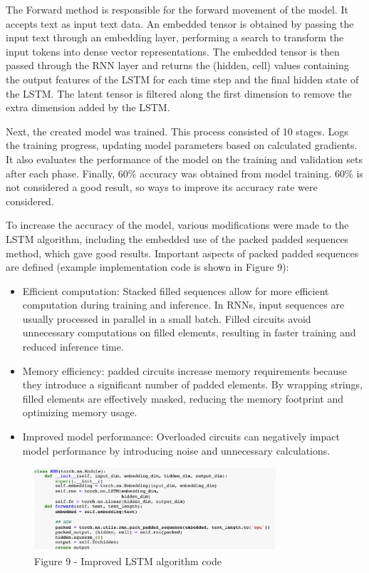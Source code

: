 The Forward method is responsible for the forward movement of the model.
It accepts text as input text data. An embedded tensor is obtained by
passing the input text through an embedding layer, performing a search
to transform the input tokens into dense vector representations. The
embedded tensor is then passed through the RNN layer and returns the
(hidden, cell) values containing the output features of the LSTM for
each time step and the final hidden state of the LSTM. The latent tensor
is filtered along the first dimension to remove the extra dimension
added by the LSTM.

Next, the created model was trained. This process consisted of 10
stages. Logs the training progress, updating model parameters based on
calculated gradients. It also evaluates the performance of the model on
the training and validation sets after each phase. Finally, 60\%
accuracy was obtained from model training. 60\% is not considered a good
result, so ways to improve its accuracy rate were considered.

To increase the accuracy of the model, various modifications were made
to the LSTM algorithm, including the embedded use of the packed padded
sequences method, which gave good results. Important aspects of packed
padded sequences are defined (example implementation code is shown in
Figure 9):

\begin{itemize}
\item
  Efficient computation: Stacked filled sequences allow for more
  efficient computation during training and inference. In RNNs, input
  sequences are usually processed in parallel in a small batch. Filled
  circuits avoid unnecessary computations on filled elements, resulting
  in faster training and reduced inference time.
\item
  Memory efficiency: padded circuits increase memory requirements
  because they introduce a significant number of padded elements. By
  wrapping strings, filled elements are effectively masked, reducing the
  memory footprint and optimizing memory usage.
\item
  Improved model performance: Overloaded circuits can negatively impact
  model performance by introducing noise and unnecessary calculations.
\end{itemize}

\begin{figure}[H]
	\centering
	\includegraphics[width=0.8\textwidth]{media/ict/image16}
	\caption*{Figure 9 - Improved LSTM algorithm code}
\end{figure}

